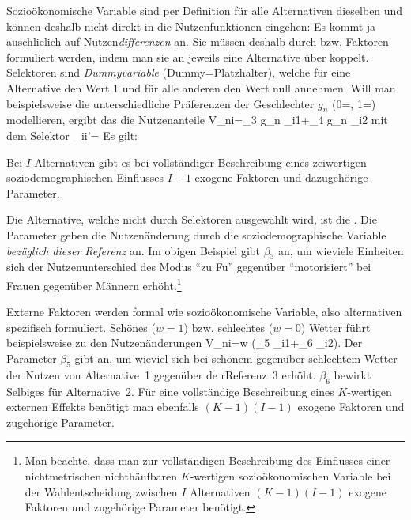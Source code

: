 \item Sozio\"okonomische Variable sind per Definition f\"ur alle
  Alternativen dieselben und k\"onnen deshalb nicht direkt in die
  Nutzenfunktionen eingehen: Es kommt ja auschlie\3lich auf
  Nutzen\emph{differenzen} an. Sie m\"ussen deshalb durch
   bzw. Faktoren formuliert
  werden, indem man sie an 
  jeweils eine Alternative \"uber  koppelt. Selektoren
sind \emph{Dummyvariable} (Dummy=Platzhalter), welche f\"ur eine Alternative den Wert 1
und f\"ur alle anderen den Wert null annehmen. Will man beispielsweise
die unterschiedliche Pr\"aferenzen der Geschlechter $g_n$ (0=\male,
1=\female) modellieren, ergibt das die Nutzenanteile
\be
\label{VkiBeispielSoz}
\Delta V_{ni}=\beta_3 g_n \delta_{i1}+\beta_4 g_n \delta_{i2}
\ee
mit dem Selektor
\be
\label{selektor}
\delta_{ii'}=
\ee
Es gilt:
\bi
\item Bei $I$ Alternativen gibt es bei vollst\"andiger Beschreibung
  eines zeiwertigen 
soziodemo\-gra\-phischen Einflusses $I-1$ exogene Faktoren und
  dazugeh\"orige Parameter.
\item Die Alternative, welche nicht durch Selektoren ausgew\"ahlt
  wird, ist die . Die Parameter geben die
  Nutzen\"anderung durch die sozio\-demo\-gra\-phische Variable \emph{bez\"uglich
  dieser Referenz} an. Im obigen Beispiel gibt $\beta_3$ an, um
  wieviele Einheiten sich der Nutzenunterschied des Modus ``zu Fu\3'' gegen\"uber
  ``motorisiert'' bei Frauen gegen\"uber M\"annern
  erh\"oht.\footnote{Man beachte, dass man zur vollst\"andigen
    Beschreibung des Einflusses einer nichtmetrischen nichth\"aufbaren
    $K$-wertigen sozio\"okonomischen Variable bei 
    der Wahlentscheidung zwischen $I$ Alternativen $(K-1)(I-1)$
    exogene Faktoren und zugeh\"orige Parameter ben\"otigt.}
\ei

\item Externe Faktoren werden formal wie sozio\"okonomische Variable,
  also alternativen spezifisch formuliert. Sch\"ones ($w=1$)
  bzw. schlechtes ($w=0$) Wetter f\"uhrt beispielsweise zu den
  Nutzen\"anderungen
\be
\label{VkiBeispielExt}
\Delta V_{ni}=w (\beta_5 \delta_{i1}+\beta_6 \delta_{i2}).
\ee
Der Parameter $\beta_5$ gibt an, um wieviel sich bei sch\"onem
gegen\"uber schlechtem Wetter der Nutzen von Alternative~1 gegen\"uber
de rReferenz~3 erh\"oht. $\beta_6$ bewirkt Selbiges f\"ur
Alternative~2.
F\"ur eine vollst\"andige Beschreibung eines $K$-wertigen externen
Effekts ben\"otigt man ebenfalls $(K-1)(I-1)$
    exogene Faktoren und zugeh\"orige Parameter.
   

